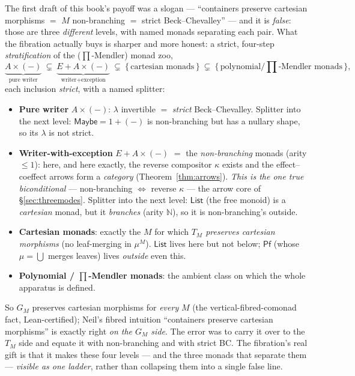 \documentclass[11pt,a4paper]{book}
\theoremstyle{plain}
\theoremstyle{definition}
\theoremstyle{remark}
\begin{document}
\begin{teachbox}
The first draft of this book's payoff was a slogan --- ``containers preserve cartesian morphisms $=$ $M$
non-branching $=$ strict Beck--Chevalley'' --- and it is \emph{false}: those are three \emph{different}
levels, with named monads separating each pair. What the fibration actually buys is sharper and more
honest: a strict, four-step \emph{stratification} of the ($\prod$-Mendler) monad zoo,
\[
  \underbrace{A\times(-)}_{\text{pure writer}}
  \ \subsetneq\ \underbrace{E+A\times(-)}_{\text{writer}+\text{exception}}
  \ \subsetneq\ \{\,\text{cartesian monads}\,\}
  \ \subsetneq\ \{\,\text{polynomial}/\prod\text{-Mendler monads}\,\},
\]
each inclusion \emph{strict}, with a named splitter:
\begin{itemize}[nosep]
  \item \textbf{Pure writer} $A\times(-)$: $\lambda$ invertible $=$ \emph{strict} Beck--Chevalley. Splitter
        into the next level: $\mathsf{Maybe}=1+(-)$ is non-branching but has a nullary shape, so its
        $\lambda$ is not strict.
  \item \textbf{Writer-with-exception} $E+A\times(-)$ $=$ the \emph{non-branching} monads (arity $\le 1$):
        here, and here exactly, the reverse compositor $\kappa$ exists and the effect--coeffect arrows form
        a \emph{category} (Theorem~\ref{thm:arrows}). \emph{This is the one true biconditional} ---
        non-branching $\Leftrightarrow$ reverse $\kappa$ --- the arrow core of \S\ref{sec:threemodes}.
        Splitter into the next level: $\mathsf{List}$ (the free monoid) is a \emph{cartesian} monad, but it
        \emph{branches} (arity $\mathbb N$), so it is non-branching's outside.
  \item \textbf{Cartesian monads}: exactly the $M$ for which \emph{$T_{M}$ preserves cartesian morphisms}
        (no leaf-merging in $\mu^{M}$). $\mathsf{List}$ lives here but not below; $\mathsf{Pf}$ (whose
        $\mu=\bigcup$ merges leaves) lives \emph{outside} even this.
  \item \textbf{Polynomial / $\prod$-Mendler monads}: the ambient class on which the whole apparatus is
        defined.
\end{itemize}
So $G_{M}$ preserves cartesian morphisms for \emph{every} $M$ (the vertical-fibred-comonad fact, Lean-certified);
Neil's fibred intuition ``containers preserve cartesian morphisms'' is exactly right \emph{on the $G_{M}$
side}. The error was to carry it over to the $T_{M}$ side and equate it with non-branching and with strict
BC. The fibration's real gift is that it makes these four levels --- and the three monads that separate them
--- \emph{visible as one ladder}, rather than collapsing them into a single false line.


\end{teachbox}
\end{document}
